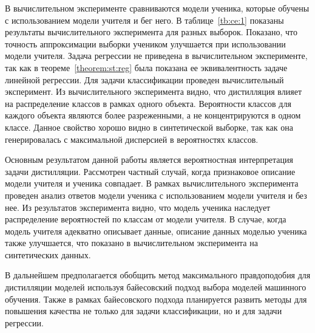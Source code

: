 \documentclass[12pt]{a&t}
\begin{document}
В вычислительном эксперименте сравниваются модели ученика, которые обучены с использованием модели учителя и бег него. В таблице~\ref{tb:ce:1} показаны результаты вычислительного эксперимента для разных выборок. Показано, что точность аппроксимации выборки учеником улучшается при использовании модели учителя. Задача регрессии не приведена в вычислительном эксперименте, так как в теореме~\ref{theorem:st:reg} была показана ее эквивалентность задаче линейной регрессии. Для задачи классификации проведен вычислительный эксперимент. Из вычислительного эксперимента видно, что дистилляция влияет на распределение классов в рамках одного объекта. Вероятности классов для каждого объекта являются более разреженными, а не концентрируются в одном классе. Данное свойство хорошо видно в синтетической выборке, так как она генерировалась с максимальной дисперсией в вероятностях классов.

Основным результатом данной работы является вероятностная интерпретация  задачи дистилляции. Рассмотрен частный случай, когда признаковое описание модели учителя и ученика совпадает. В рамках вычислительного эксперимента проведен анализ ответов модели ученика с использованием модели учителя и без нее. Из результатов эксперимента видно, что модель ученика наследует распределение вероятностей по классам от модели учителя. В случае, когда модель учителя адекватно описывает данные, описание данных моделью ученика также улучшается, что показано в вычислительном эксперимента на синтетических данных.

В дальнейшем предполагается обобщить метод максимального правдоподобия для дистилляции моделей используя байесовский подход выбора моделей машинного обучения. Также в рамках байесовского подхода планируется развить методы для повышения качества не только для задачи классификации, но и для задачи регрессии.
\end{document}
